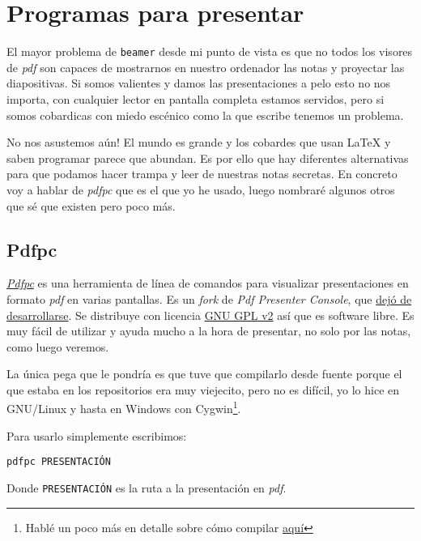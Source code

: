 \section{Programas para presentar}

El mayor problema de \lstinline!beamer! desde mi punto de vista es que
no todos los visores de \emph{pdf} son capaces de mostrarnos en nuestro
ordenador las notas y proyectar las diapositivas. Si somos valientes y
damos las presentaciones a pelo esto no nos importa, con cualquier
lector en pantalla completa estamos servidos, pero si somos cobardicas
con miedo escénico como la que escribe tenemos un problema.

No nos asustemos aún! El mundo es grande y los cobardes que usan LaTeX
y saben programar parece que abundan. Es por ello que hay diferentes
alternativas para que podamos hacer trampa y leer de nuestras notas
secretas. En concreto voy a hablar de \emph{pdfpc} que es el que yo he
usado, luego nombraré algunos otros que sé que existen pero poco más.

\subsection{Pdfpc}

\href{https://pdfpc.github.io/}{\emph{Pdfpc}} es una herramienta de
línea de comandos para visualizar presentaciones en formato \emph{pdf}
en varias pantallas. Es un \emph{fork} de \emph{Pdf Presenter Console},
que \href{https://github.com/jakobwesthoff/Pdf-Presenter-Console}{dejó
de desarrollarse}. Se distribuye con licencia
\href{https://github.com/pdfpc/pdfpc/blob/master/LICENSE.txt}{GNU GPL
v2} así que es software libre. Es muy fácil de utilizar y ayuda mucho a
la hora de presentar, no solo por las notas, como luego veremos.

La única pega que le pondría es que tuve que compilarlo desde fuente
porque el que estaba en los repositorios era muy viejecito, pero no es
difícil, yo lo hice en GNU/Linux y hasta en Windows con Cygwin\footnote{Hablé
  un poco más en detalle sobre cómo compilar
  \href{https://ondahostil.wordpress.com/2016/10/24/lo-que-he-aprendido-compilar-pdf-presenter-console-con-cygwin/}{aquí}}.

Para usarlo simplemente escribimos:

\begin{lstlisting}[language={[latex]tex}]
pdfpc PRESENTACIÓN
\end{lstlisting}

Donde \lstinline!PRESENTACIÓN! es la ruta a la presentación en
\emph{pdf}.

